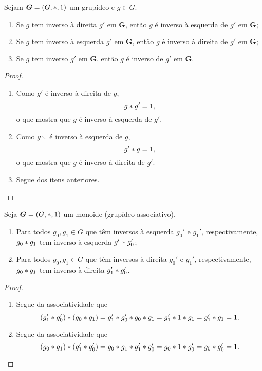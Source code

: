\begin{proposition}
Sejam $\bm G = (G,\ast,1)$ um grupídeo e $g \in G$.
	\begin{enumerate}
		\item Se $g$ tem inverso à direita $g'$ em $\bm G$, então $g$ é inverso à esquerda de $g'$ em $\bm G$;
		\item Se $g$ tem inverso à esquerda $g'$ em $\bm G$, então $g$ é inverso à direita de $g'$ em $\bm G$;
		\item Se $g$ tem inverso $g'$ em $\bm G$, então $g$ é inverso de $g'$ em $\bm G$.
	\end{enumerate}
\end{proposition}
\begin{proof}
	\begin{enumerate}
	\item Como $g'$ é inverso à direita de $g$,
		\begin{equation*}
		g \ast g' = 1,
		\end{equation*}
	o que mostra que $g$ é inverso à esquerda de $g'$.
	\item Como $g \vid$ é inverso à esquerda de $g$,
		\begin{equation*}
		g' \ast g = 1,
		\end{equation*}
	o que mostra que $g$ é inverso à direita de $g'$.
	\item Segue dos itens anteriores.
	\qedhere
	\end{enumerate}
\end{proof}

\begin{proposition}
\label{prop:composicao.inverso.grupideo}
Seja $\bm G = (G,\ast,1)$ um monoide (grupídeo associativo).
	\begin{enumerate}
	\item Para todos $g_0,g_1 \in G$ que têm inversos à esquerda $g_0'$ e $g_1'$, respectivamente, $g_0 \ast g_1$ tem inverso à esquerda $g_1' \ast g_0'$;
	\item Para todos $g_0,g_1 \in G$ que têm inversos à direita $g_0'$ e $g_1'$, respectivamente, $g_0 \ast g_1$ tem inverso à direita $g_1' \ast g_0'$.
	\end{enumerate}
\end{proposition}
\begin{proof}
	\begin{enumerate}
	\item Segue da associatividade que
		\begin{equation*}
		(g_1' \ast g_0') \ast (g_0 \ast g_1) = g_1' \ast g_0' \ast g_0 \ast g_1 = g_1' \ast 1 \ast g_1 = g_1' \ast g_1 = 1.
		\end{equation*}
	\item Segue da associatividade que
		\begin{equation*}
		(g_0 \ast g_1) \ast (g_1' \ast g_0') = g_0 \ast g_1 \ast g_1' \ast g_0' = g_0 \ast 1 \ast g_0' = g_0 \ast g_0' = 1.
			\qedhere
		\end{equation*}
	\end{enumerate}
\end{proof}

